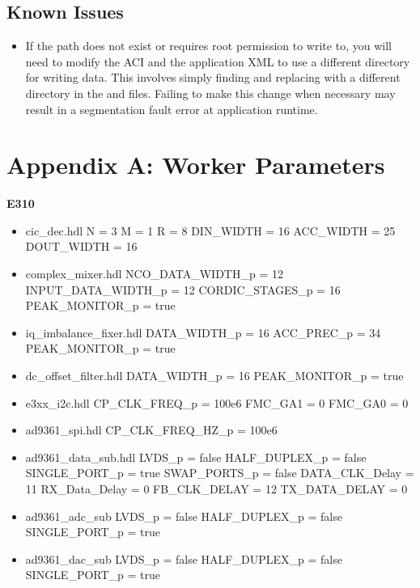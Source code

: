 \subsection{Known Issues}
\noindent
\begin{itemize}
  \item If the path  does not exist or requires root permission to write to, you will need to modify the ACI and the application XML to use a different directory for writing data. This involves simply finding and replacing  with a different directory in the  and  files. Failing to make this change when necessary may result in a segmentation fault error at application runtime.
\end{itemize}
\section{Appendix A: Worker Parameters}
\begin{minipage}[t]{.5\textwidth}
	\textbf{E310}
	\begin{itemize}
		\item cic\_dec.hdl
			\subitem N = 3
			\subitem M = 1
			\subitem R = 8
			\subitem DIN\_WIDTH = 16
			\subitem ACC\_WIDTH = 25
			\subitem DOUT\_WIDTH = 16
		\item complex\_mixer.hdl
			\subitem NCO\_DATA\_WIDTH\_p = 12
			\subitem INPUT\_DATA\_WIDTH\_p = 12
			\subitem CORDIC\_STAGES\_p = 16
			\subitem PEAK\_MONITOR\_p = true
		\item iq\_imbalance\_fixer.hdl
			\subitem DATA\_WIDTH\_p = 16
			\subitem ACC\_PREC\_p = 34
			\subitem PEAK\_MONITOR\_p = true
		\item dc\_offset\_filter.hdl
			\subitem DATA\_WIDTH\_p = 16
			\subitem PEAK\_MONITOR\_p = true
		\item e3xx\_i2c.hdl
			\subitem CP\_CLK\_FREQ\_p = 100e6
			\subitem FMC\_GA1 = 0
			\subitem FMC\_GA0 = 0
		\item ad9361\_spi.hdl
			\subitem CP\_CLK\_FREQ\_HZ\_p = 100e6
		\item ad9361\_data\_sub.hdl
			\subitem LVDS\_p = false
			\subitem HALF\_DUPLEX\_p = false
			\subitem SINGLE\_PORT\_p = true
			\subitem SWAP\_PORTS\_p = false
			\subitem DATA\_CLK\_Delay = 11
			\subitem RX\_Data\_Delay = 0
			\subitem FB\_CLK\_DELAY = 12
			\subitem TX\_DATA\_DELAY = 0
		\item ad9361\_adc\_sub
			\subitem LVDS\_p = false
			\subitem HALF\_DUPLEX\_p = false
			\subitem SINGLE\_PORT\_p = true
		\item ad9361\_dac\_sub
			\subitem LVDS\_p = false
			\subitem HALF\_DUPLEX\_p = false
			\subitem SINGLE\_PORT\_p = true
	\end{itemize}
\end{minipage} \newpage
